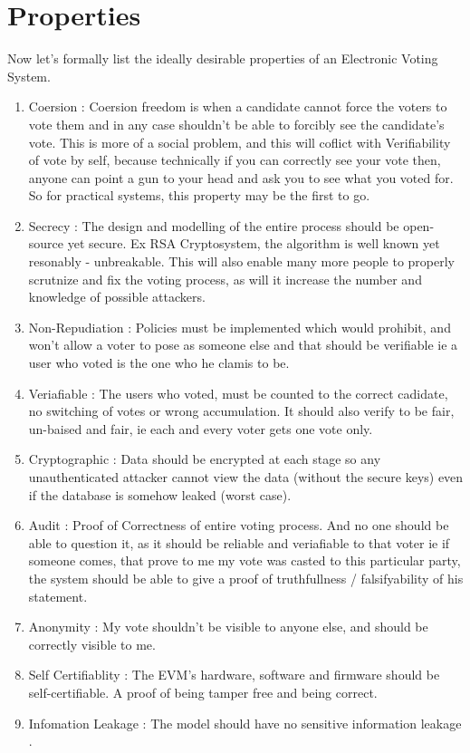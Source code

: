 \documentclass[12pt]{report}
\begin{document}
\section{Properties}
Now let's formally list the ideally desirable properties of an Electronic Voting System.
\begin{enumerate}
  \item Coersion : Coersion freedom is when a candidate cannot force the voters to vote them and in any case shouldn't be able to forcibly see the candidate's vote. This is more of a social problem, and this will coflict with Verifiability of vote by self, because technically if you can correctly see your vote then, anyone can point a gun to your head and ask you to see what you voted for.  \\
  So for practical systems, this property may be the first to go.
  \item Secrecy : The design and modelling of the entire process should be open-source yet secure. Ex RSA Cryptosystem, the algorithm is well known yet resonably - unbreakable. This will also enable many more people to properly scrutnize and fix the voting process, as will it increase the number and knowledge of possible attackers. 
  \item Non-Repudiation : Policies must be implemented which would prohibit, and won't allow a voter to pose as someone else and that should be verifiable ie a user who voted is the one who he clamis to be.
  \item Veriafiable : The users who voted, must be counted to the correct cadidate, no switching of votes or wrong accumulation. It should also verify to be fair, un-baised and fair, ie each and every voter gets one vote only. 
  \item Cryptographic : Data should be encrypted at each stage so any unauthenticated attacker cannot view the data (without the secure keys) even if the database is somehow leaked (worst case).
  \item Audit : Proof of Correctness of entire voting process. And no one should be able to question it, as it should be reliable and veriafiable to that voter ie if someone comes, that prove to me my vote was casted to this particular party, the system should be able to give a proof of truthfullness / falsifyability of his statement.
  \item Anonymity : My vote shouldn't be visible to anyone else, and should be correctly visible to me.
  \item Self Certifiablity : The EVM's hardware, software and firmware should be self-certifiable. A proof of being tamper free and being correct.
  \item Infomation Leakage : The model should have no sensitive information leakage .
 \end{enumerate}
\end{document}
